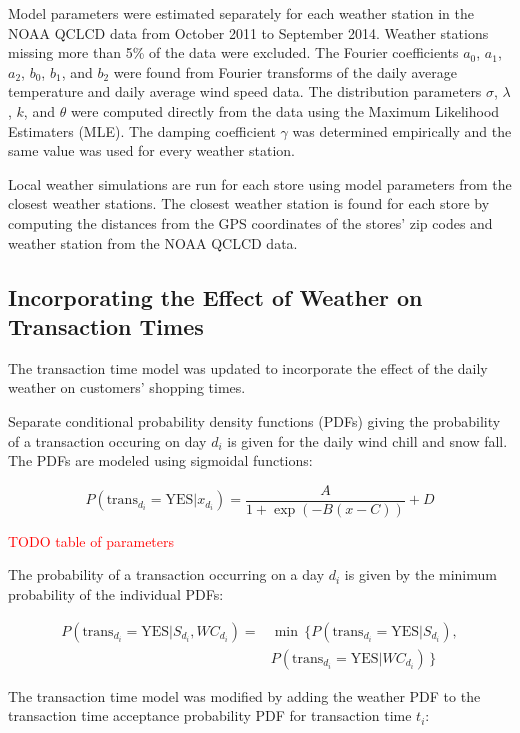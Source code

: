 \documentclass[conference]{IEEEtran}
\begin{document}
Model parameters were estimated separately for each weather station in the NOAA QCLCD data from October 2011 to September 2014.  Weather stations missing more than 5\% of the data were excluded.  The Fourier coefficients $a_0$, $a_1$, $a_2$, $b_0$, $b_1$, and $b_2$ were found from Fourier transforms of the daily average temperature and daily average wind speed data. The distribution parameters $\sigma$, $\lambda$, $k$, and $\theta$ were computed directly from the data using the Maximum Likelihood Estimaters (MLE).  The damping coefficient $\gamma$ was determined empirically and the same value was used for every weather station.

Local weather simulations are run for each store using model parameters from the closest weather stations. The closest weather station is found for each store by computing the distances from the GPS coordinates of the stores' zip codes and weather station from the NOAA QCLCD data. 

\subsection{Incorporating the Effect of Weather on Transaction Times}
The transaction time model was updated to incorporate the effect of the daily weather on customers' shopping times.

Separate conditional probability density functions (PDFs) giving the probability of a transaction occuring on day $d_i$ is given for the daily wind chill and snow fall.  The PDFs are modeled using sigmoidal functions:

\begin{equation}
P(\text{trans}_{d_i}=\text{YES}|x_{d_i}) = \frac{A}{1+\exp(-B(x-C))}+D
\end{equation}

\textcolor{red}{TODO table of parameters}

The probability of a transaction occurring on a day $d_i$ is given by the minimum probability of the individual PDFs:

\begin{align}
P(\text{trans}_{d_i}=\text{YES} | S_{d_i}, WC_{d_i}) = &\min \, \{ P(\text{trans}_{d_i}=\text{YES}|S_{d_i}), \nonumber \\ 
&P(\text{trans}_{d_i}=\text{YES} | WC_{d_i}) \, \}
\end{align}

The transaction time model was modified by adding the weather PDF to the transaction time acceptance probability PDF for transaction time $t_i$:
\end{document}
